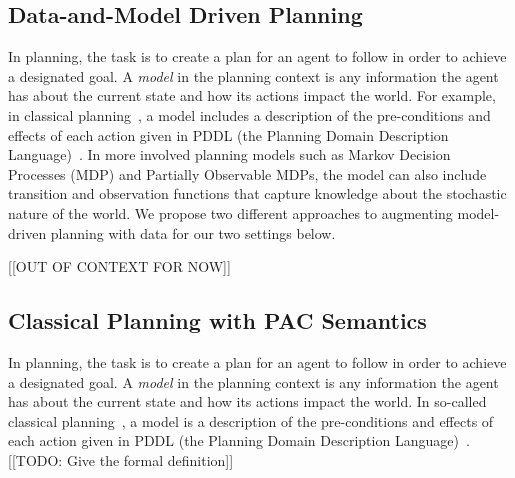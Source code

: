 \documentclass[12pt]{article}
\begin{document}




\subsection{Data-and-Model Driven Planning}


In planning, the task is to create a plan for an agent to follow in order to achieve a designated goal. A {\em model} in the planning context is any information the agent has about the current state and how its actions impact the world. For example, in classical planning~\cite{fikes1971strips}, a model includes a description of the pre-conditions and effects of each action given in PDDL (the Planning Domain Description Language)~\cite{mcdermott1998pddl}. In more involved planning models such as Markov Decision Processes (MDP) and Partially Observable MDPs, the model can also include transition and observation functions that capture knowledge about the stochastic nature of the world. We propose two different approaches to augmenting model-driven planning with data for our two settings below.


[[OUT OF CONTEXT FOR NOW]]
\subsection{Classical Planning with PAC Semantics}
In planning, the task is to create a plan for an agent to follow in order to achieve a designated goal. A {\em model} in the planning context is any information the agent has about the current state and how its actions impact the world. In so-called classical planning~\cite{fikes1971strips}, a model is a description of the pre-conditions and effects of each action given in PDDL (the Planning Domain Description Language)~\cite{mcdermott1998pddl}. [[TODO: Give the formal definition]] 
\end{document}
